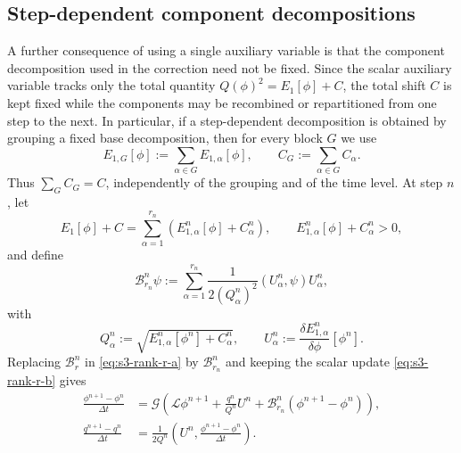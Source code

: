 \documentclass[10pt,onefignum,onetabnum,hidelinks]{siamart251216}
\begin{document}
\subsection{Step-dependent component decompositions}
\label{subsec:step-dependent-decompositions}

A further consequence of using a single auxiliary variable is that the component decomposition used in the correction need not be fixed. Since the scalar auxiliary variable tracks only the total quantity $Q(\phi)^2=E_1[\phi]+C$, the total shift \(C\) is kept fixed while the components may be recombined or repartitioned from one step to the next. In particular, if a step-dependent decomposition is obtained by grouping a fixed base decomposition, then for every block \(G\) we use
\[
E_{1,G}[\phi]:=\sum_{\alpha\in G}E_{1,\alpha}[\phi],
\qquad
C_G:=\sum_{\alpha\in G}C_\alpha.
\]
Thus \(\sum_G C_G=C\), independently of the grouping and of the time level. At step $n$, let
\begin{equation}
E_1[\phi]+C
=
\sum_{\alpha=1}^{r_n}
\left(E_{1,\alpha}^n[\phi]+C_\alpha^n\right),
\qquad
E_{1,\alpha}^n[\phi]+C_\alpha^n>0,
\label{eq:s3-step-split}
\end{equation}
and define
\begin{equation}
\mathcal B_{r_n}^n\psi
:=
\sum_{\alpha=1}^{r_n}
\frac{1}{2(Q_\alpha^n)^2}
\left(U_\alpha^n,\psi\right)U_\alpha^n,
\label{eq:s3-step-B}
\end{equation}
with
\[
Q_\alpha^n:=\sqrt{E_{1,\alpha}^n[\phi^n]+C_\alpha^n},
\qquad
U_\alpha^n:=\frac{\delta E_{1,\alpha}^n}{\delta\phi}[\phi^n].
\]
Replacing $\mathcal B_r^n$ in \eqref{eq:s3-rank-r-a} by
$\mathcal B_{r_n}^n$ and keeping the scalar update
\eqref{eq:s3-rank-r-b} gives
\begin{align}
\frac{\phi^{n+1}-\phi^n}{\Delta t}
&=
\mathcal G\left(
\mathcal L\phi^{n+1}
+
\frac{q^n}{Q^n}U^n
+
\mathcal B_{r_n}^n(\phi^{n+1}-\phi^n)
\right),
\label{eq:s3-step-rank-a}
\\
\frac{q^{n+1}-q^n}{\Delta t}
&=
\frac{1}{2Q^n}
\left(
U^n,\frac{\phi^{n+1}-\phi^n}{\Delta t}
\right).
\label{eq:s3-step-rank-b}
\end{align}
\end{document}
